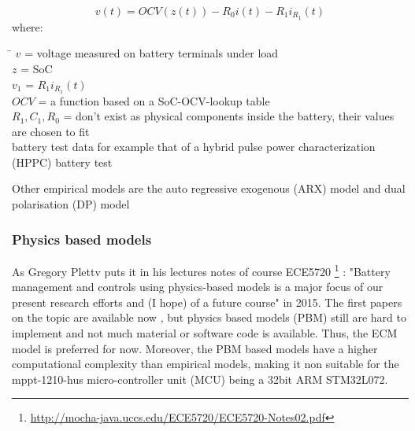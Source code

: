 \begin{equation}
{v}(t) = {OCV}(z(t))  - {R}_{0} i(t) - {R}_{1} {i}_{R_1}(t) 
\label{equation:ECM}
\end{equation}
where: 
\begin{tabbing}
\phantom{$v(t)  \  \ \ \ \ \ \ \ \ \ \ \ $}\= \kill
$v$\> =  voltage measured on battery terminals under load   \\
$z  $\> =  SoC  \\
$v_	1$\> =  ${R}_{1} {i}_{R_1}(t)$ \\
$OCV $\>  = a function based on a SoC-OCV-lookup table \\
$R_1,C_1,R_0$\> = don't exist as physical components inside the battery, their values are chosen to fit  \\
battery test data for example that of a hybrid pulse power characterization (HPPC) battery test  \\ %

\end{tabbing}

Other empirical models are the auto regressive exogenous (ARX) model and dual polarisation (DP) model %

\subsubsection{Physics based models}
\label{section:Physics based models}

As Gregory Plettv puts it in his lectures notes of course ECE5720  \footnote{ \url{http://mocha-java.uccs.edu/ECE5720/ECE5720-Notes02.pdf}} :  "Battery management and controls using physics-based models is a major focus of our present research efforts and (I hope) of a future
course" in 2015. The first papers on the topic are available now \cite{9477587}, but physics based models (PBM) still are hard to implement and not much material or software code is available. Thus, the ECM model is preferred for now. Moreover, the PBM based models have a higher computational complexity than
empirical models, making it non suitable for the mppt-1210-hus micro-controller unit (MCU) being a 32bit ARM STM32L072. %


